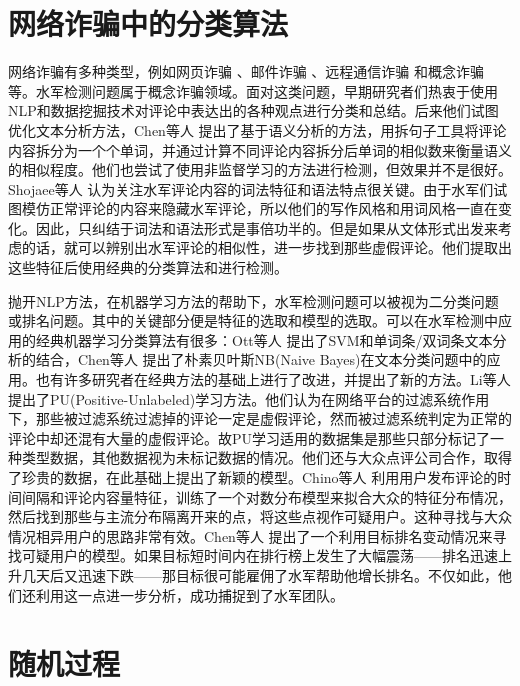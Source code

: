 \section{网络诈骗中的分类算法}

网络诈骗有多种类型，例如网页诈骗 \cite{Spirin:2012}、邮件诈骗 \cite{Castillo:2007}、远程通信诈骗 \cite{Yao:2017}和概念诈骗 \cite{Jindal:2008}等。水军检测问题属于概念诈骗领域。面对这类问题，早期研究者们热衷于使用NLP和数据挖掘技术对评论中表达出的各种观点进行分类和总结。后来他们试图优化文本分析方法，Chen等人 \parencite{Chen:2013}提出了基于语义分析的方法，用拆句子工具将评论内容拆分为一个个单词，并通过计算不同评论内容拆分后单词的相似数来衡量语义的相似程度。他们也尝试了使用非监督学习的方法进行检测，但效果并不是很好。Shojaee等人 \parencite{Shojaee:2013}认为关注水军评论内容的词法特征和语法特点很关键。由于水军们试图模仿正常评论的内容来隐藏水军评论，所以他们的写作风格和用词风格一直在变化。因此，只纠结于词法和语法形式是事倍功半的。但是如果从文体形式出发来考虑的话，就可以辨别出水军评论的相似性，进一步找到那些虚假评论。他们提取出这些特征后使用经典的分类算法和进行检测。

抛开NLP方法，在机器学习方法的帮助下，水军检测问题可以被视为二分类问题或排名问题。其中的关键部分便是特征的选取和模型的选取。可以在水军检测中应用的经典机器学习分类算法有很多：Ott等人 \parencite{Ott:2011}提出了SVM和单词条/双词条文本分析的结合，Chen等人 \parencite{CHEN:2009}提出了朴素贝叶斯NB(Naive Bayes)在文本分类问题中的应用。也有许多研究者在经典方法的基础上进行了改进，并提出了新的方法。Li等人 \parencite{Li:2014}提出了PU(Positive-Unlabeled)学习方法。他们认为在网络平台的过滤系统作用下，那些被过滤系统过滤掉的评论一定是虚假评论，然而被过滤系统判定为正常的评论中却还混有大量的虚假评论。故PU学习适用的数据集是那些只部分标记了一种类型数据，其他数据视为未标记数据的情况。他们还与大众点评公司合作，取得了珍贵的数据，在此基础上提出了新颖的模型。Chino等人 \parencite{Chino:2017}利用用户发布评论的时间间隔和评论内容量特征，训练了一个对数分布模型来拟合大众的特征分布情况，然后找到那些与主流分布隔离开来的点，将这些点视作可疑用户。这种寻找与大众情况相异用户的思路非常有效。Chen等人 \parencite{Chen:2017}提出了一个利用目标排名变动情况来寻找可疑用户的模型。如果目标短时间内在排行榜上发生了大幅震荡——排名迅速上升几天后又迅速下跌——那目标很可能雇佣了水军帮助他增长排名。不仅如此，他们还利用这一点进一步分析，成功捕捉到了水军团队。




\section{随机过程}

